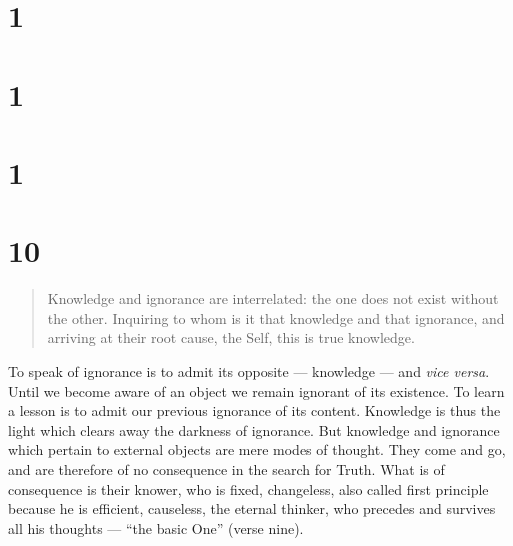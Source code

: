 \documentclass[12pt]{report}
\begin{document}
\section{1}

\begin{quote}

\end{quote}


\section{1}

\begin{quote}

\end{quote}


\section{1}

\begin{quote}

\end{quote}




\section{10}

\begin{quote}
Knowledge and ignorance are interrelated: the one does not exist
without the other. Inquiring to whom is it that knowledge and that
ignorance, and arriving at their root cause, the Self, this is true
knowledge. 
\end{quote}


To speak of ignorance is to admit its opposite --- knowledge --- and
\emph{vice versa}. Until we become aware of an object we remain
ignorant of its existence. To learn a lesson is to admit our previous
ignorance of its content. Knowledge is thus the light which clears
away the darkness of ignorance. But knowledge and ignorance which
pertain to external objects are mere modes of thought. They come and
go, and are therefore of no consequence in the search for Truth. What
is of consequence is their knower, who is fixed, changeless, also
called first principle because he is efficient, causeless, the eternal
thinker, who precedes and survives all his thoughts --- ``the basic
One'' (verse nine).
\end{document}
